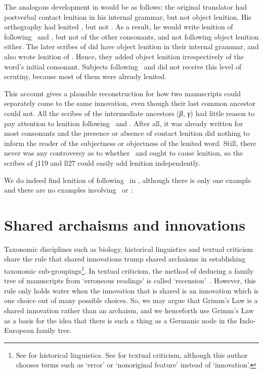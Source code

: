 The analogous development in  would be as follows: the original translator had postverbal contact lenition in his internal grammar, but not object lenition. His orthography had lenited , but not . As a result, he would write lenition of  following \ei\ and , but not of the other consonants, and not following object lenition either. The later scribes of  did have object lenition in their internal grammar, and also wrote lenition of . Hence, they added object lenition irrespectively of the word's initial consonant. Subjects following \ei\ and  did not receive this level of scrutiny, because most of them were already lenited.

This account gives a plausible reconstruction for how two manuscripts could separately come to the same innovation, even though their last common ancestor could not. All the scribes of the intermediate ancestors (\textit{β, γ}) had little reason to pay attention to lenition following \ei\ and . After all, it was already written for most consonants and the presence or absence of contact lenition did nothing to inform the reader of the subjectness or objectness of the lenited word. Still, there never was any controversy as to whether \ei\ and  ought to cause lenition, so the scribes of \gls{j119} and \gls{ll27} could easily add lenition independently.

We do indeed find lenition of  following \ei\ in , although there is only one example and there are no examples involving \oes\ or :

\begin{mwl}
\end{mwl}

\section{Shared archaisms and innovations}
\label{sec:shar-innov-arch}

Taxonomic disciplines such as biology, historical linguistics and textual criticism  share the rule that shared innovations trump shared archaisms in establishing taxonomic sub-groupings\footnote{See \eg \textcite[169]{MT_Trask15} for historical linguistics. See \eg \textcite[103--104, 107]{Tar_Classical95} for textual criticism, although this author chooses terms such as `error' or `nonoriginal feature' instead of `innovation'.}. In textual criticism, the method of deducing a family tree of manuscripts from `erroneous readings' is called `recension'~\autocite[232]{Sar_Manuscript13}. However, this rule only holds water when the innovation that is shared is an innovation which is one choice out of many possible choices. So,  we may argue that \eg Grimm's Law is a shared innovation rather than an archaism, and we henceforth use Grimm's Law as a basis for the idea that there is such a thing as a Germanic node in the Indo-European family tree.

